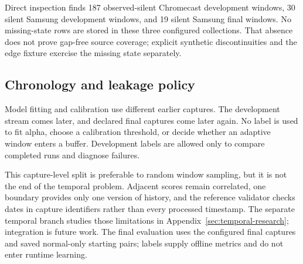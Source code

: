 Direct inspection finds 187 observed-silent Chromecast development windows,
30 silent Samsung development windows, and 19 silent Samsung final windows.
No missing-state rows are stored in these three configured collections.
That absence does not prove gap-free source coverage; explicit synthetic
discontinuities and the edge fixture exercise the missing state separately.

\subsection{Chronology and leakage policy}

Model fitting and calibration use different earlier captures. The development
stream comes later, and declared final captures come later again. No label is
used to fit alpha, choose a calibration threshold, or decide whether an adaptive
window enters a buffer. Development labels are allowed only to compare completed
runs and diagnose failures.

This capture-level split is preferable to random window sampling, but it is not
the end of the temporal problem. Adjacent scores remain correlated, one boundary
provides only one version of history, and the reference validator checks dates in
capture identifiers rather than every processed timestamp. The separate temporal
branch studies those limitations in Appendix~\ref{sec:temporal-research};
integration is future work.
The final evaluation uses the configured final captures and saved normal-only
starting pairs; labels supply offline metrics and do not enter runtime learning.

